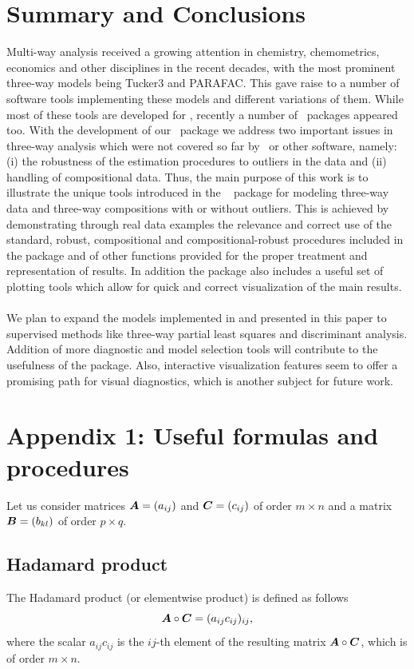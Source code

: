 \documentclass[article,shortnames, nojss]{jss}
\newcommand{\vv}[1]{\mbox{\boldmath$#1$}}
\begin{document}
\section{Summary and Conclusions}
\label{sec:conclusions}
Multi-way analysis received a growing attention in chemistry,
chemometrics, economics and other disciplines in the recent
decades, with the most prominent three-way models being
Tucker3 and PARAFAC. This gave raise to a number of software
tools implementing these models and different variations of
them.  While most of these tools are developed for , recently
a number of ~packages appeared too. With the development of
our ~package we address two important issues in three-way
analysis which were not covered so far by ~or other software,
namely: (i) the robustness of the estimation procedures to
outliers in the data  and (ii) handling of compositional data.
Thus, the main purpose of this work is to illustrate the
unique tools introduced in the ~ package  for
modeling three-way data and three-way compositions with or
without outliers. This is achieved by demonstrating through
real data examples the relevance and correct use of the standard,
robust, compositional and compositional-robust procedures included
in the package and of other functions provided for the proper
treatment and representation of results. In addition the package
also includes a useful set of plotting tools which allow for
quick and correct visualization of the main results.\\\\
We plan to expand the models implemented in  and presented
in this paper to supervised methods like three-way partial
least squares and discriminant analysis. Addition of more diagnostic
and model selection tools will contribute to the usefulness of the package.
Also, interactive visualization features seem to offer a promising
path for visual diagnostics, which is another subject
for future work.

\section*{Appendix 1: Useful formulas and procedures}
\label{sec:appendix}
Let us consider matrices $\vv{A} = (a_{ij})$ and $\vv{C} = (c_{ij})$ of order $ m \times n$ and a matrix
$\vv{B} = (b_{kl})$ of order $p \times q$.
\subsection* {Hadamard product}
\label{app:Hadamard}
The Hadamard product (or elementwise product) is defined as follows
\[
\vv{A} \circ \vv{C} = (a_{ij} c_{ij})_{ij},
\]
where the scalar $a_{ij} c_{ij}$ is the $ij$-th element of the resulting matrix $\vv{A} \circ \vv{C}$, which is of order $m \times n$.
\end{document}
